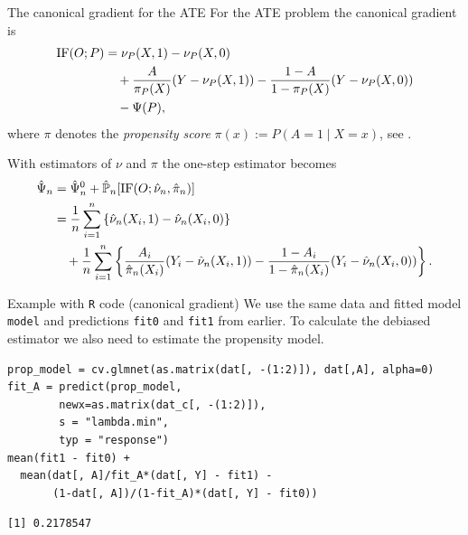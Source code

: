 \documentclass[smaller]{beamer}\usepackage{listings}
\begin{document}
\begin{frame}[label={sec:org1858cfc}]{The canonical gradient for the ATE}
\small For the ATE problem the canonical gradient is
\begin{align*}
  \mathrm{IF}(O; P)
  & = \nu_P(X, 1) - \nu_P(X, 0)
  \\
  & \quad
    + \frac{A}{\pi_P(X)}(Y - \nu_P(X, 1))
    - \frac{1-A}{1-\pi_P(X)}(Y - \nu_P(X, 0))
  \\
  & \quad
    - \Psi(P),
\end{align*}
where \(\pi\) denotes the \textit{propensity score} \(\pi(x) := P(A=1 \mid X=x)\), see
\cite{kennedy2022semiparametric,kennedy2016semiparametric}.

\vfill

With estimators of \(\nu\) and \(\pi\) the one-step estimator becomes
\begin{align*}
  \hat{\Psi}_n
  &  = \hat{\Psi}^0_n + \hat{\mathbb{P}}_n[\mathrm{IF}(O; \hat{\nu}_n, \hat{\pi}_n)]
  \\
  & = \frac{1}{n}\sum_{i=1}^{n}
    \left\{
    \hat\nu_n(X_i, 1) - \hat\nu_n(X_i, 0)
    \right\}
  \\
  & \quad
    +\frac{1}{n}\sum_{i=1}^{n}
    \left\{
    \frac{A_i}{\hat\pi_n(X_i)}(Y_i - \hat\nu_n(X_i, 1))
    - \frac{1-A_i}{1-\hat\pi_n(X_i)}(Y_i - \hat\nu_n(X_i, 0))    
    \right\}.
\end{align*}
\end{frame}

\begin{frame}[label={sec:org1d24ed1},fragile]{Example with \texttt{R} code (canonical gradient)}
 We use the same data and fitted model \texttt{model} and predictions \texttt{fit0} and \texttt{fit1} from earlier. To
calculate the debiased estimator we also need to estimate the propensity model.
\lstset{language=r,label= ,caption= ,captionpos=b,numbers=none}
\begin{lstlisting}
prop_model = cv.glmnet(as.matrix(dat[, -(1:2)]), dat[,A], alpha=0)
fit_A = predict(prop_model,
		newx=as.matrix(dat_c[, -(1:2)]),
		s = "lambda.min",
		typ = "response")
mean(fit1 - fit0) + 
  mean(dat[, A]/fit_A*(dat[, Y] - fit1) -
       (1-dat[, A])/(1-fit_A)*(dat[, Y] - fit0))
\end{lstlisting}

\begin{verbatim}
[1] 0.2178547
\end{verbatim}
\end{frame}
\end{document}
